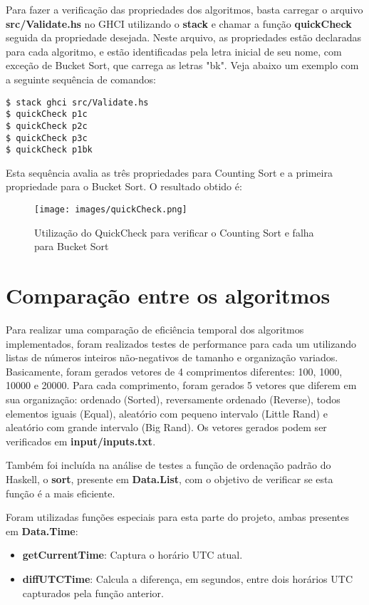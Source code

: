 \documentclass[12pt,a4paper]{article}
\begin{document}
Para fazer a verificação das propriedades dos algoritmos, basta carregar o arquivo \textbf{src/Validate.hs} no GHCI utilizando o \textbf{stack} e chamar a função \textbf{quickCheck} seguida da propriedade desejada. Neste arquivo, as propriedades estão declaradas para cada algoritmo, e estão identificadas pela letra inicial de seu nome, com exceção de Bucket Sort, que carrega as letras "bk". Veja abaixo um exemplo com a seguinte sequência de comandos:

\begin{lstlisting}
$ stack ghci src/Validate.hs
$ quickCheck p1c
$ quickCheck p2c
$ quickCheck p3c
$ quickCheck p1bk
\end{lstlisting}

Esta sequência avalia as três propriedades para Counting Sort e a primeira propriedade para o Bucket Sort. O resultado obtido é:

\begin{figure}[h]
	\centering
	\texttt{[image: images/quickCheck.png]}
	\caption{Utilização do QuickCheck para verificar o Counting Sort e falha para Bucket Sort}
\end{figure}

\section{Comparação entre os algoritmos}
Para realizar uma comparação de eficiência temporal dos algoritmos implementados, foram realizados testes de performance para cada um utilizando listas de números inteiros não-negativos de tamanho e organização variados. Basicamente, foram gerados vetores de 4 comprimentos diferentes: 100, 1000, 10000 e 20000. Para cada comprimento, foram gerados 5 vetores que diferem em sua organização: ordenado (Sorted), reversamente ordenado (Reverse), todos elementos iguais (Equal), aleatório com pequeno intervalo (Little Rand) e aleatório com grande intervalo (Big Rand). Os vetores gerados podem ser verificados em \textbf{input/inputs.txt}.

Também foi incluída na análise de testes a função de ordenação padrão do Haskell, o \textbf{sort}, presente em \textbf{Data.List}, com o objetivo de verificar se esta função é a mais eficiente.

Foram utilizadas funções especiais para esta parte do projeto, ambas presentes em \textbf{Data.Time}:

\begin{itemize}
\item \textbf{getCurrentTime}: Captura o horário UTC atual.
\item \textbf{diffUTCTime}: Calcula a diferença, em segundos, entre dois horários UTC capturados pela função anterior.
\end{itemize}
\end{document}

